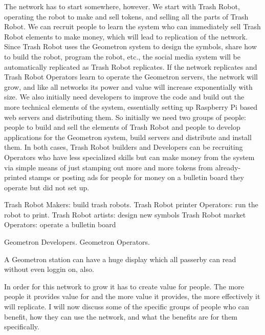 The network has to start somewhere, however.  We start with Trash Robot, operating the robot to make and sell tokens, and selling all the parts of Trash Robot.  We can recruit people to learn the system who can immediately sell Trash Robot elements to make money, which will lead to replication of the network.  Since Trash Robot uses the Geometron system to design the symbols, share how to build the robot, program the robot, etc., the social media system will be automatically replicated as Trash Robot replicates.  If the network replicates and Trash Robot Operators learn to operate the Geometron servers, the network will grow, and like all networks its power and value will increase exponentially with size.  We also initially need developers to improve the code and build out the more technical elements of the system, essentially setting up Raspberry Pi based web servers and distributing them.  So initially we need two groups of people: people to build and sell the elements of Trash Robot and people to develop applications for the Geometron system, build servers and distribute and install them.  In both cases, Trash Robot builders and Developers can be recruiting Operators who have less specialized skills but can make money from the system via simple means of just stamping out more and more tokens from already-printed stamps or posting ads for people for money on a bulletin board they operate but did not set up.


Trash Robot Makers: build trash robots.
Trash Robot  printer Operators: run the robot to print.
Trash Robot artists: design new symbols
Trash Robot market Operators: operate a bulletin board



Geometron Developers.    Geometron Operators.


A Geometron station can have a huge display which all passerby can read without even loggin on, also.

In order for this network to grow it has to create value for people. The more people it provides value for and the more value it provides, the more effectively it will replicate.  I will now discuss some of the specific groups of people who can benefit, how they can use the network, and what the benefits are for them specifically.

